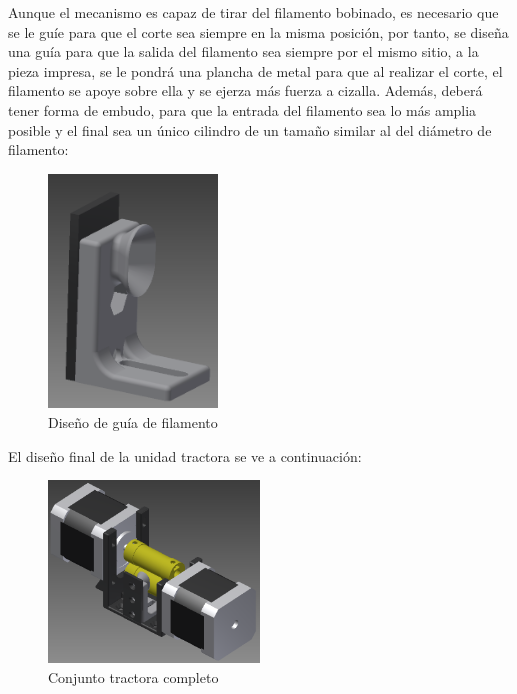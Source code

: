Aunque el mecanismo es capaz de tirar del filamento bobinado, es necesario que se le guíe para que el corte sea siempre en la misma posición, por tanto, se diseña una guía para que la salida del filamento sea siempre por el mismo sitio, a la pieza impresa, se le pondrá una plancha de metal para que al realizar el corte, el filamento se apoye sobre ella y se ejerza más fuerza a cizalla. Además, deberá tener forma de embudo, para que la entrada del filamento sea lo más amplia posible y el final sea un único cilindro de un tamaño similar al del diámetro de filamento:

\begin{figure}[H]
    \centering
    \includegraphics[width=0.4\textwidth]{images/peletizadora/guia.png}
    \caption{Diseño de guía de filamento}
    \label{fig:peletizadora_guia}
\end{figure}

El diseño final de la unidad tractora se ve a continuación:

\begin{figure}[H]
    \centering
    \includegraphics[width=0.5\textwidth]{images/peletizadora/conjunto_tractora.png}
    \caption{Conjunto tractora completo}
    \label{fig:peletizadora_conjunto}
\end{figure}

